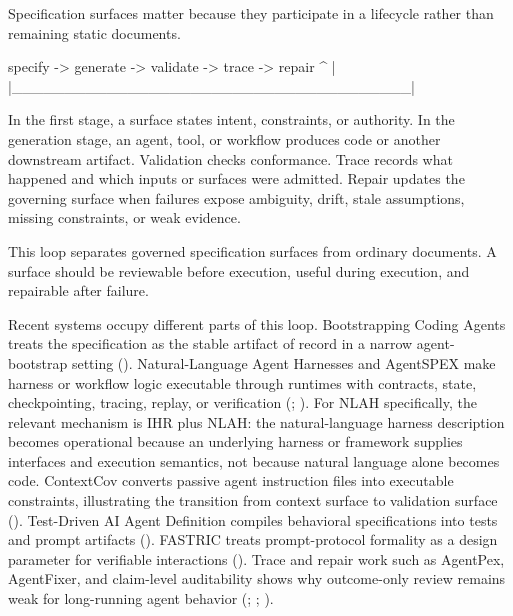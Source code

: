 \documentclass[
]{article}
\newenvironment{Shaded}{}{}
\newcommand{\NormalTok}[1]{#1}
\begin{document}
Specification surfaces matter because they participate in a lifecycle
rather than remaining static documents.

\begin{Shaded}
\begin{Highlighting}[]
\NormalTok{specify {-}\textgreater{} generate {-}\textgreater{} validate {-}\textgreater{} trace {-}\textgreater{} repair}
\NormalTok{   \^{}                                      |}
\NormalTok{   |\_\_\_\_\_\_\_\_\_\_\_\_\_\_\_\_\_\_\_\_\_\_\_\_\_\_\_\_\_\_\_\_\_\_\_\_\_\_|}
\end{Highlighting}
\end{Shaded}

In the first stage, a surface states intent, constraints, or authority.
In the generation stage, an agent, tool, or workflow produces code or
another downstream artifact. Validation checks conformance. Trace
records what happened and which inputs or surfaces were admitted. Repair
updates the governing surface when failures expose ambiguity, drift,
stale assumptions, missing constraints, or weak evidence.

This loop separates governed specification surfaces from ordinary
documents. A surface should be reviewable before execution, useful
during execution, and repairable after failure.

Recent systems occupy different parts of this loop. Bootstrapping Coding
Agents treats the specification as the stable artifact of record in a
narrow agent-bootstrap setting
().
Natural-Language Agent Harnesses and AgentSPEX make harness or workflow
logic executable through runtimes with contracts, state, checkpointing,
tracing, replay, or verification (; ). For NLAH
specifically, the relevant mechanism is IHR plus NLAH: the
natural-language harness description becomes operational because an
underlying harness or framework supplies interfaces and execution
semantics, not because natural language alone becomes code. ContextCov
converts passive agent instruction files into executable constraints,
illustrating the transition from context surface to validation surface
(). Test-Driven AI Agent
Definition compiles behavioral specifications into tests and prompt
artifacts (). FASTRIC treats
prompt-protocol formality as a design parameter for verifiable
interactions (). Trace and repair
work such as AgentPex, AgentFixer, and claim-level auditability shows
why outcome-only review remains weak for long-running agent behavior
(;
;
).
\end{document}
